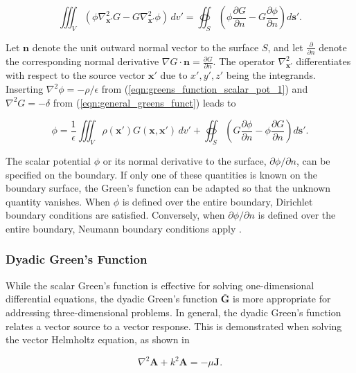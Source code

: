 \begin{equation}
	\iiint_V \left(\phi \nabla_\mathbf{x'}^2 G - G \nabla_\mathbf{x'}^2 \phi \right)\, dv' = \oiint_S \left(\phi \frac{\partial G}{\partial n} - G\frac{\partial \phi}{\partial n}\right)d\mathbf{s'}.
\end{equation}


Let $\mathbf{n}$ denote the unit outward normal vector to the surface $S$, and let $\frac{\partial }{\partial n}$ denote the corresponding normal derivative $\nabla G \cdot \mathbf{n} = \frac{\partial G}{\partial n}$. The operator $\nabla^2_\mathbf{x'}$ differentiates with respect to the source vector $\mathbf{x'}$ due to $x',y',z'$ being the integrands. Inserting $\nabla^2 \phi = -\rho / \epsilon$ from (\ref{eqn:greens_function_scalar_pot_1}) and $\nabla^2 G = -\delta$ from (\ref{eqn:general_greens_funct}) leads to \cite[p.~58]{Collin_2015}

\begin{equation}
	\phi = \frac{1}{\epsilon}\iiint_V \rho (\mathbf{x'})G(\mathbf{x},\mathbf{x'})\, dv'+\oiint_S\left(G\frac{\partial \phi}{\partial n}-\phi \frac{\partial G }{\partial n}\right)d\mathbf{s}'.
\end{equation}

The scalar potential $\phi$ or its normal derivative to the surface, $\partial\phi/\partial n$, can be specified on the boundary. If only one of these quantities is known on the boundary surface, the Green’s function can be adapted so that the unknown quantity vanishes. When $\phi$ is defined over the entire boundary, Dirichlet boundary conditions are satisfied. Conversely, when $\partial\phi/\partial n$ is defined over the entire boundary, Neumann boundary conditions apply \cite[pp. 55-59]{Collin_2015}.

\subsubsection{Dyadic Green's Function}\label{sec:dyad_green}

While the scalar Green’s function is effective for solving one-dimensional differential equations, the dyadic Green’s function $\mathbf{\bar G}$ is more appropriate for addressing three-dimensional problems. In general, the dyadic Green’s function relates a vector source to a vector response. This is demonstrated when solving the vector Helmholtz equation, as shown in \cite[p.~91]{Collin_2015}

\begin{equation}
	\nabla^2\mathbf{A}+k^2\mathbf{A}=-\mu \mathbf{J}.
	\label{eqn:helmholtz}
\end{equation}

